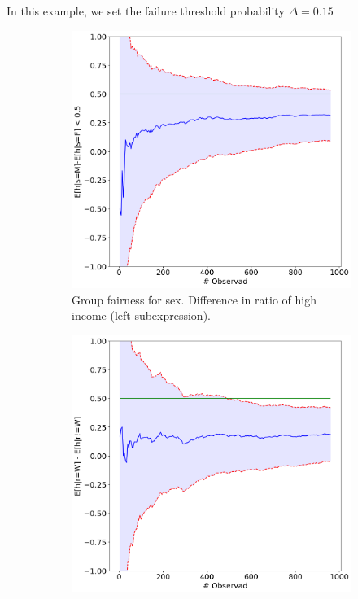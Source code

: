 In this example, we set the failure threshold probability $\Delta = 0.15$
\begin{figure}
    \centering
    \begin{subfigure}{0.48\linewidth}
    \includegraphics[width=\linewidth]{avoir/images/adult-left-initial.png}
    \caption{Group fairness for sex. Difference in ratio of high income (left subexpression).}
    \label{fig:casestudy:adult:specplot:left}
    \end{subfigure}
    \begin{subfigure}{0.48\linewidth}
    \centering
    \includegraphics[width=\linewidth]{avoir/images/adult-right-initial.png}

\end{subfigure}
\end{figure}
